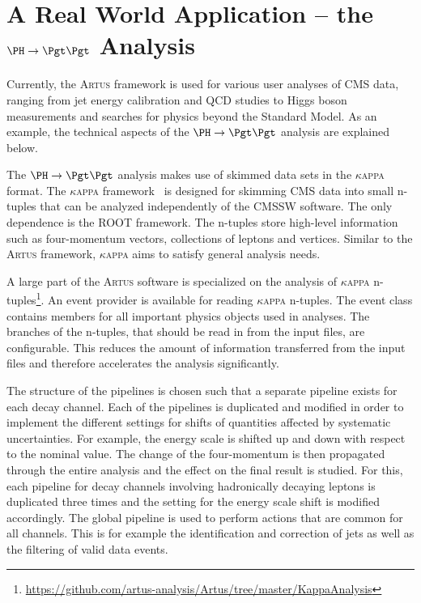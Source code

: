\documentclass[3p]{elsarticle}
\newcommand{\software}[1]{\textsc{#1}\xspace}
\newcommand{\artus}{\software{Artus}}
\newcommand{\kapa}{{\Large$\kappa$}\software{appa}}
\begin{document}
\section{\texorpdfstring{A Real World Application -- the $\PH\to\Pgt\Pgt$ Analysis}{A Real World Application - the H to Tau Tau Analysis}}
\label{section_artus_example_htt}

Currently, the \artus framework is used for various user analyses of CMS data, ranging from jet energy calibration and QCD studies to Higgs boson measurements and searches for physics beyond the Standard Model.
As an example, the technical aspects of the $\PH\to\Pgt\Pgt$ analysis are explained below.

The $\PH\to\Pgt\Pgt$ analysis makes use of skimmed data sets in the \kapa format.
The \kapa framework~\cite{kappa} is designed for skimming CMS data into small n-tuples that can be analyzed independently of the CMSSW software.
The only dependence is the ROOT framework.
The n-tuples store high-level information such as four-momentum vectors, collections of leptons and vertices.
Similar to the \artus framework, \kapa aims to satisfy general analysis needs.

A large part of the \artus software is specialized on the analysis of \kapa n-tuples\footnote{\url{https://github.com/artus-analysis/Artus/tree/master/KappaAnalysis}}.
An event provider is available for reading \kapa n-tuples.
The event class contains members for all important physics objects used in analyses.
The branches of the n-tuples, that should be read in from the input files, are configurable.
This reduces the amount of information transferred from the input files and therefore accelerates the analysis significantly.

The structure of the pipelines is chosen such that a separate pipeline exists for each decay channel.
Each of the pipelines is duplicated and modified in order to implement the different settings for shifts of quantities affected by systematic uncertainties.
For example, the \Pgt energy scale is shifted up and down with respect to the nominal value.
The change of the \Pgt four-momentum is then propagated through the entire analysis and the effect on the final result is studied.
For this, each pipeline for decay channels involving hadronically decaying \Pgt leptons is duplicated three times and the setting for the \Pgt energy scale shift is modified accordingly.
The global pipeline is used to perform actions that are common for all channels.
This is for example the identification and correction of jets as well as the filtering of valid data events.
\end{document}
